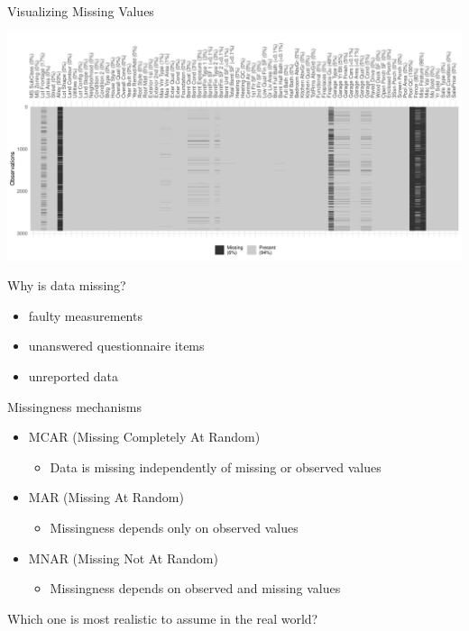 \documentclass[11pt,compress,t,notes=noshow, xcolor=table]{beamer}
\begin{document}
\begin{frame}{Visualizing Missing Values}

    \begin{center}
        \includegraphics[width=\textwidth]{figure/missing_values_visualization}
    \end{center}

\end{frame}
\begin{frame}{Why is data missing? }
    \vfill
    \begin{itemize}
        \item faulty measurements
        \item unanswered questionnaire items
        \item unreported data
    \end{itemize}
    \vfill
\end{frame}
\begin{frame}{Missingness mechanisms}
    \vfill
    \begin{itemize}
        \item MCAR (Missing Completely At Random)
        \begin{itemize}
            \item Data is missing independently of missing or observed values
        \end{itemize}
        \item MAR (Missing At Random)
        \begin{itemize}
            \item Missingness depends only on observed values
        \end{itemize}
        \item MNAR (Missing Not At Random)
        \begin{itemize}
            \item Missingness depends on observed and missing values
        \end{itemize}
    \end{itemize}    
    \vfill
    \pause
    Which one is most realistic to assume in the real world?
    \vfill
\end{frame}
\end{document}
